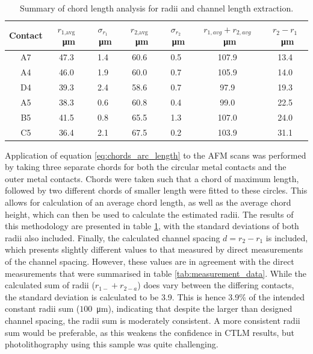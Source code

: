 \begin{refsection}
\begin{table}[ht]
\centering
\caption{Summary of chord length analysis for radii and channel length extraction.}
\label{tab:chord_results}
\begin{tabular}{|c|c|c|c|c|c|c|}
\hline
\textbf{Contact} & \( r_{\text{1,avg}} \)~\si{\micro\metre} & \( \sigma_{r_{1}} \)~\si{\micro\metre} & \( r_{\text{2,avg}} \)~\si{\micro\metre} & \( \sigma_{r_{2}} \)~\si{\micro\metre} & \( r_{1,avg} + r_{2,avg} \)~\si{\micro\metre} & \( r_{2} - r_{1} \)~\si{\micro\metre} \\
\hline
A7 & 47.3 & 1.4 & 60.6 & 0.5  & 107.9 & 13.4 \\
A4 & 46.0 & 1.9 & 60.0 & 0.7  & 105.9 & 14.0 \\
D4 & 39.3 & 2.4 & 58.6 & 0.7  & 97.9 & 19.3 \\
A5 & 38.3 & 0.6 & 60.8 & 0.4  & 99.0 & 22.5 \\
B5 & 41.5 & 0.8 & 65.5 & 1.3  & 107.0 & 24.0 \\
C5 & 36.4 & 2.1 & 67.5 & 0.2  & 103.9 & 31.1 \\
\hline
\end{tabular}
\end{table}

Application of equation \ref{eq:chords_arc_length} to the AFM scans was performed by taking three separate chords for both the circular metal contacts and the outer metal contacts. Chords were taken such that a chord of maximum length, followed by two different chords of smaller length were fitted to these circles. This allows for calculation of an average chord length, as well as the average chord height, which can then be used to calculate the estimated radii. The results of this methodology are presented in table \ref{tab:chord_results}, with the standard deviations of both radii also included. Finally, the calculated channel spacing $d = r_{2} - r_{1}$ is included, which presents slightly different values to that measured by direct measurements of the channel spacing. However, these values are in agreement with the direct measurements that were summarised in table \ref{tab:measurement_data}. While the calculated sum of radii ($r_{1-} + r_{2-a}$) does vary between the differing contacts, the standard deviation is calculated to be 3.9. This is hence 3.9\% of the intended constant radii sum ($100$~\si{\micro\metre}), indicating that despite the larger than designed channel spacing, the radii sum is moderately consistent. A more consistent radii sum would be preferable, as this weakens the confidence in CTLM results, but photolithography using this sample was quite challenging.


\end{refsection}
